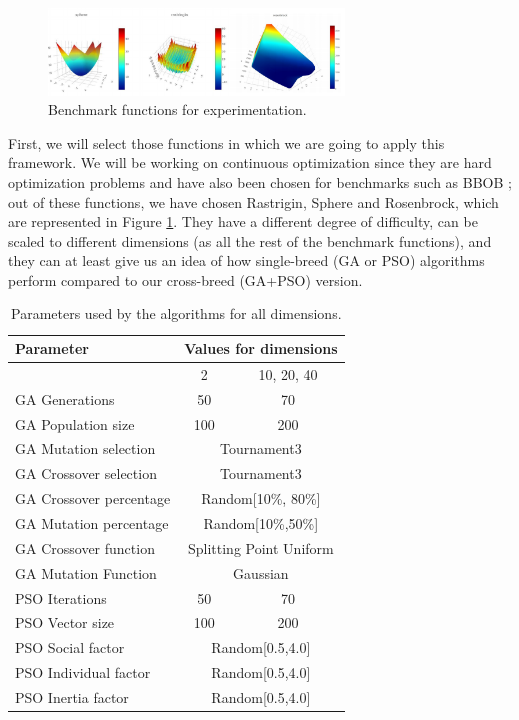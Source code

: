 \documentclass[runningheads]{llncs}
\begin{document}
\begin{figure}[htp] \centering
\includegraphics[width=0.7\textwidth]{img/benchmark.png} 
\caption{Benchmark
functions for experimentation.} 
\label{fig:functions} 
\end{figure} %

First, we will select those functions in which we are going to apply this framework. We
will be working on continuous optimization since they are hard optimization
problems and have also been chosen for benchmarks such as BBOB
\cite{hansen2010bbob}; out of these functions, we have chosen Rastrigin, Sphere
and Rosenbrock, which are represented in Figure \ref{fig:functions}. They have a
different degree of difficulty, can be scaled to different dimensions (as all
the rest of the benchmark functions), and they can at least give us an idea of
how single-breed (GA or PSO) algorithms perform compared to our cross-breed
(GA+PSO) version.  

   \begin{table}[h!tp]
    \caption{Parameters used by the algorithms for all dimensions.}
    \label{table:ga-pso-parameters}
    \centering
    \begin{tabular}{|l|c|c|}
    \hline
    Parameter & \multicolumn{2}{c|}{Values for dimensions} \\
      \hline
      & 2 & 10, 20, 40 \\
    \hline
    GA Generations & 50 &  70\\
    \hline
     GA Population size & 100 & 200\\
    \hline
    GA Mutation selection &  \multicolumn{2}{c|}{Tournament3}\\
    \hline
    GA Crossover selection & \multicolumn{2}{c|}{Tournament3} \\
    \hline
    GA Crossover percentage & \multicolumn{2}{c|}{Random[10\%, 80\%]} \\
    \hline
    GA Mutation percentage & \multicolumn{2}{c|}{Random[10\%,50\%]} \\
    \hline
    GA Crossover function & \multicolumn{2}{c|}{Splitting Point Uniform} \\
    \hline
    GA Mutation Function & \multicolumn{2}{c|}{Gaussian} \\
      \hline 
      \hline
    PSO Iterations & 50 & 70\\
    \hline
    PSO Vector size & 100 & 200\\
    \hline
    PSO Social factor & \multicolumn{2}{c|}{Random[0.5,4.0]} \\
    \hline
    PSO Individual factor & \multicolumn{2}{c|}{Random[0.5,4.0]} \\
    \hline
    PSO Inertia factor & \multicolumn{2}{c|}{Random[0.5,4.0]} \\
    \hline
    \end{tabular}
\end{table}
\end{document}

